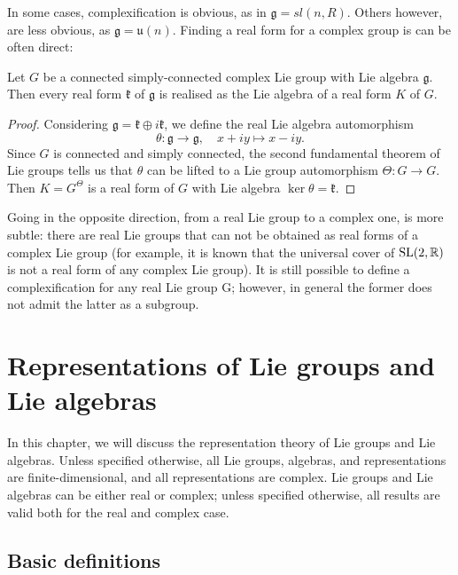 \documentclass{report}
\begin{document}
In some cases, complexiﬁcation is obvious, as in $\mathfrak g = sl(n, R)$.
Others however, are less obvious, as $\mathfrak g = \mathfrak u(n)$.
Finding a real form for a complex group is can be often direct:
\begin{proposition}
    Let $G$ be a connected simply-connected complex Lie group with Lie algebra $\mathfrak g$.
    Then every real form $\mathfrak k$ of $\mathfrak g$ is realised as the Lie algebra of a real form $K$ of $G$.
\end{proposition}
\begin{proof}
    Considering $\mathfrak g = \mathfrak k \oplus i \mathfrak k$, we define the real Lie algebra automorphism
    \[
    \theta: \mathfrak g \to \mathfrak g, \quad x + iy \mapsto x - iy.
    \]
    Since $G$ is connected and simply connected, the second fundamental theorem of Lie groups tells us that $\theta$ can be lifted to a Lie group automorphism $\Theta: G \to G$.
    Then $K = G^\Theta$ is a real form of $G$ with Lie algebra $\ker \theta = \mathfrak k$.
\end{proof}
Going in the opposite direction, from a real Lie group to a complex one, is
more subtle: there are real Lie groups that can not be obtained as real forms
of a complex Lie group (for example, it is known that the universal cover
of $\operatorname{{\mathrm{SL}}}(2, \mathbb R)$ is not a real form of any complex Lie group). It is still possible
to deﬁne a complexiﬁcation for any real Lie group G; however, in general the former does not admit the latter as a subgroup.


\chapter{Representations of Lie groups and Lie algebras}
In this chapter, we will discuss the representation theory of Lie groups and Lie
algebras. 
Unless speciﬁed otherwise, all Lie groups, algebras,
and representations are ﬁnite-dimensional, and all representations are complex.
Lie groups and Lie algebras can be either real or complex; unless speciﬁed
otherwise, all results are valid both for the real and complex case.

\section{Basic definitions}
\end{document}

